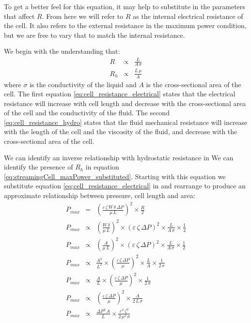       To get a better feel for this equation, it may help to substitute in the parameters that affect $R$.
      From here we will refer to $R$ as the internal electrical resistance of the cell.
      It also refers to the external resistance in the maximum power condition, but we are free to vary that to match the internal resistance.

      We begin with the understanding that:
      \begin{eqnarray}
          R & \propto & \frac{L}{A\,\sigma}\label{eq:cell_resistance_electrical}\\
          R_{h} & \propto & \frac{L\,\mu}{A}\label{eq:cell_resistance_hydro}
      \end{eqnarray}
      where $\sigma$ is the conductivity of the liquid and $A$ is the cross-sectional area of the cell.
      The first equation \eqref{eq:cell_resistance_electrical} states that the electrical resistance will increase with cell length and decrease with the cross-sectional area of the cell and the conductivity of the fluid.
      The second \eqref{eq:cell_resistance_hydro} states that the fluid mechanical resistance will increase with the length of the cell and the viscosity of the fluid, and decrease with the cross-sectional area of the cell.

      We can identify an inverse relationship with hydrostatic resistance in
      We can identify the presence of $R_{h}$ in equation \eqref{eq:streamingCell_maxPower_substituted}.
      Starting with this equation we substitute equation \eqref{eq:cell_resistance_electrical} in and rearrange to produce an approximate relationship between pressure, cell length and area:
      \begin{eqnarray}
          P_{max} & = & \left(\frac{\varepsilon\,\zeta\,W\,\delta\,\Delta P}{\mu\,L}\right)^{2}\times\frac{R}{2}\nonumber\\
          P_{max} & \propto & \left(\frac{W\,\delta}{\mu\,L}\right)^{2}\times\left(\varepsilon\,\zeta\,\Delta P\right)^{2}\times \frac{L}{A\,\sigma} \times\frac{1}{2}\nonumber\\
          P_{max} & \propto & \left(\frac{A}{\mu\,L}\right)^{2}\times\left(\varepsilon\,\zeta\,\Delta P\right)^{2}\times \frac{L}{A\,\sigma} \times\frac{1}{2}\nonumber\\
          P_{max} & \propto & \frac{A^{2}}{L^{2}}\times\left(\frac{\varepsilon\,\zeta\,\Delta P}{\mu}\right)^{2}\times \frac{L}{A} \times\frac{1}{2\,\sigma}\nonumber\\
          P_{max} & \propto & \frac{A}{L}\times\left(\frac{\varepsilon\,\zeta\,\Delta P}{\mu}\right)^{2}\times\frac{1}{2\,\sigma}\nonumber\\
          P_{max} & \propto & \left(\frac{\varepsilon\,\zeta\,\Delta P}{\mu}\right)^{2}\times\frac{A}{2\,L\,\sigma}\nonumber\\
          P_{max} & \propto & \frac{\Delta P^{2}\,A}{L}\times \frac{\varepsilon^{2}\,\zeta^{2}}{2\,\mu^{2}\,\sigma}
          \label{eq:streamingCell_maxPower_relationship}
      \end{eqnarray}

